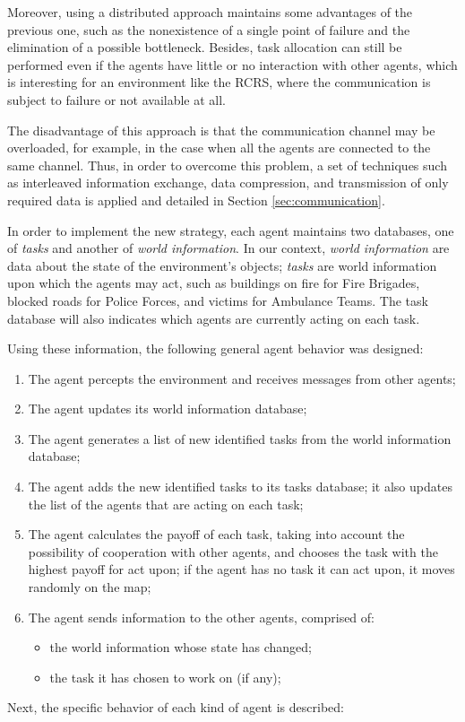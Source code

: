 Moreover, using a distributed approach maintains some advantages of the previous one, such as the nonexistence of a single point of failure and the elimination of a possible bottleneck. Besides, task allocation can still be performed even if the agents have little or no interaction with other agents, which is interesting for an environment like the RCRS, where the communication is subject to failure or not available at all.

The disadvantage of this approach is that the communication channel may be overloaded, for example, in the case when all the agents are connected to the same channel. Thus, in order to overcome this problem, a set of techniques such as interleaved information exchange, data compression, and transmission of only required data is applied and detailed in Section \ref{sec:communication}.

In order to implement the new strategy, each agent maintains two databases, one of {\it tasks} and another of {\it world information}. In our context, {\it world information} are data about the state of the environment's objects; {\it tasks} are world information upon which the agents may act, such as buildings on fire for Fire Brigades, blocked roads for Police Forces, and victims for Ambulance Teams. The task database will also indicates which agents are currently acting on each task.

Using these information, the following general agent behavior was designed:
\begin{enumerate}
\item The agent percepts the environment and receives messages from other agents;
\item The agent updates its world information database;
\item The agent generates a list of new identified tasks from the world information database;
\item The agent adds the new identified tasks to its tasks database; it also updates the list of the agents that are acting on each task;
\item The agent calculates the payoff of each task, taking into account the possibility of cooperation with other agents, and chooses the task with the highest payoff for act upon; if the agent has no task it can act upon, it moves randomly on the map;
\item The agent sends information to the other agents, comprised of:
\begin{itemize}
\item the world information whose state has changed;
\item the task it has chosen to work on (if any);
\end{itemize}
\end{enumerate}

Next, the specific behavior of each kind of agent is described:
